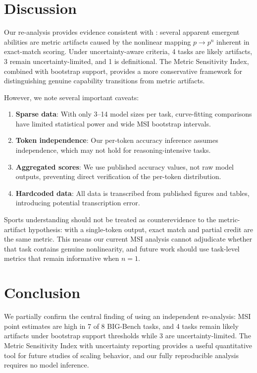 \documentclass[11pt,a4paper]{article}
\begin{document}
\section{Discussion}

Our re-analysis provides evidence consistent with \citet{schaeffer2023}: several apparent emergent abilities are metric artifacts caused by the nonlinear mapping $p \to p^n$ inherent in exact-match scoring. Under uncertainty-aware criteria, 4 tasks are likely artifacts, 3 remain uncertainty-limited, and 1 is definitional. The Metric Sensitivity Index, combined with bootstrap support, provides a more conservative framework for distinguishing genuine capability transitions from metric artifacts.

However, we note several important caveats:
\begin{enumerate}
    \item \textbf{Sparse data}: With only 3--14 model sizes per task, curve-fitting comparisons have limited statistical power and wide MSI bootstrap intervals.
    \item \textbf{Token independence}: Our per-token accuracy inference assumes independence, which may not hold for reasoning-intensive tasks.
    \item \textbf{Aggregated scores}: We use published accuracy values, not raw model outputs, preventing direct verification of the per-token distribution.
    \item \textbf{Hardcoded data}: All data is transcribed from published figures and tables, introducing potential transcription error.
\end{enumerate}

Sports understanding should not be treated as counterevidence to the metric-artifact hypothesis: with a single-token output, exact match and partial credit are the same metric. This means our current MSI analysis cannot adjudicate whether that task contains genuine nonlinearity, and future work should use task-level metrics that remain informative when $n=1$.

\section{Conclusion}

We partially confirm the central finding of \citet{schaeffer2023} using an independent re-analysis: MSI point estimates are high in 7 of 8 BIG-Bench tasks, and 4 tasks remain likely artifacts under bootstrap support thresholds while 3 are uncertainty-limited. The Metric Sensitivity Index with uncertainty reporting provides a useful quantitative tool for future studies of scaling behavior, and our fully reproducible analysis requires no model inference.
\end{document}
